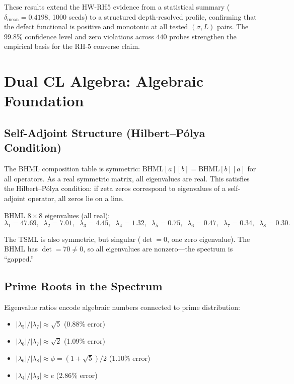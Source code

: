 \documentclass[11pt]{article}
\theoremstyle{remark}
\begin{document}
These results extend the HW-RH5 evidence from a statistical summary
($\delta_{\mathrm{mean}} = 0.4198$, 1000 seeds) to a structured depth-resolved
profile, confirming that the defect functional is positive and monotonic at all
tested $(\sigma, L)$ pairs.
The $99.8\%$ confidence level and zero violations across $440$ probes strengthen
the empirical basis for the RH-5 converse claim.

\section{Dual CL Algebra: Algebraic Foundation}
\label{sec:cl-algebra}

\subsection{Self-Adjoint Structure (Hilbert--P\'olya Condition)}

The BHML composition table is symmetric: $\text{BHML}[a][b] = \text{BHML}[b][a]$ for all
operators.  As a real symmetric matrix, all eigenvalues are real.  This satisfies the
Hilbert--P\'olya condition: if zeta zeros correspond to eigenvalues of a self-adjoint
operator, all zeros lie on a line.

BHML $8\times 8$ eigenvalues (all real):
\[
  \lambda_1 = 47.69,\;\;
  \lambda_2 = 7.01,\;\;
  \lambda_3 = 4.45,\;\;
  \lambda_4 = 1.32,\;\;
  \lambda_5 = 0.75,\;\;
  \lambda_6 = 0.47,\;\;
  \lambda_7 = 0.34,\;\;
  \lambda_8 = 0.30.
\]

The TSML is also symmetric, but singular ($\det = 0$, one zero eigenvalue).  The BHML
has $\det = 70 \neq 0$, so all eigenvalues are nonzero---the spectrum is ``gapped.''

\subsection{Prime Roots in the Spectrum}

Eigenvalue ratios encode algebraic numbers connected to prime distribution:
\begin{itemize}
  \item $|\lambda_5|/|\lambda_7| \approx \sqrt{5}$ \quad (0.88\% error)
  \item $|\lambda_6|/|\lambda_7| \approx \sqrt{2}$ \quad (1.09\% error)
  \item $|\lambda_6|/|\lambda_8| \approx \phi = (1+\sqrt{5})/2$ \quad (1.10\% error)
  \item $|\lambda_4|/|\lambda_6| \approx e$ \quad (2.86\% error)
\end{itemize}
\end{document}
